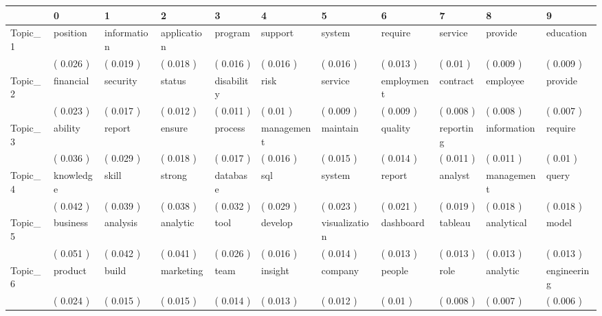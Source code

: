 \begin{tabular}{lllllllllll}
\toprule
{} &          0 &            1 &            2 &           3 &            4 &              5 &             6 &          7 &            8 &            9 \\
\midrule
Topic\_1  &   position &  information &  application &     program &      support &         system &       require &    service &      provide &    education \\
         &  ( 0.026 ) &    ( 0.019 ) &    ( 0.018 ) &   ( 0.016 ) &    ( 0.016 ) &      ( 0.016 ) &     ( 0.013 ) &   ( 0.01 ) &    ( 0.009 ) &    ( 0.009 ) \\
Topic\_2  &  financial &     security &       status &  disability &         risk &        service &    employment &   contract &     employee &      provide \\
         &  ( 0.023 ) &    ( 0.017 ) &    ( 0.012 ) &   ( 0.011 ) &     ( 0.01 ) &      ( 0.009 ) &     ( 0.009 ) &  ( 0.008 ) &    ( 0.008 ) &    ( 0.007 ) \\
Topic\_3  &    ability &       report &       ensure &     process &   management &       maintain &       quality &  reporting &  information &      require \\
         &  ( 0.036 ) &    ( 0.029 ) &    ( 0.018 ) &   ( 0.017 ) &    ( 0.016 ) &      ( 0.015 ) &     ( 0.014 ) &  ( 0.011 ) &    ( 0.011 ) &     ( 0.01 ) \\
Topic\_4  &  knowledge &        skill &       strong &    database &          sql &         system &        report &    analyst &   management &        query \\
         &  ( 0.042 ) &    ( 0.039 ) &    ( 0.038 ) &   ( 0.032 ) &    ( 0.029 ) &      ( 0.023 ) &     ( 0.021 ) &  ( 0.019 ) &    ( 0.018 ) &    ( 0.018 ) \\
Topic\_5  &   business &     analysis &     analytic &        tool &      develop &  visualization &     dashboard &    tableau &   analytical &        model \\
         &  ( 0.051 ) &    ( 0.042 ) &    ( 0.041 ) &   ( 0.026 ) &    ( 0.016 ) &      ( 0.014 ) &     ( 0.013 ) &  ( 0.013 ) &    ( 0.013 ) &    ( 0.013 ) \\
Topic\_6  &    product &        build &    marketing &        team &      insight &        company &        people &       role &     analytic &  engineering \\
         &  ( 0.024 ) &    ( 0.015 ) &    ( 0.015 ) &   ( 0.014 ) &    ( 0.013 ) &      ( 0.012 ) &      ( 0.01 ) &  ( 0.008 ) &    ( 0.007 ) &    ( 0.006 ) \\

\end{tabular}
